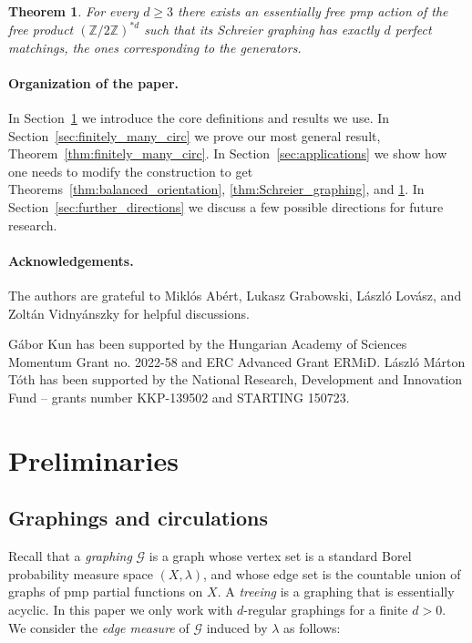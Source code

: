 \documentclass[10pt]{article}
\theoremstyle{plain}
\newtheorem{theorem}[lemma]{Theorem}
\theoremstyle{remark}
\newcommand{\1}{\mathbbm{1}}
\newcommand{\Z}{\mathbb{Z}}
\numberwithin{equation}{section}
\begin{document}
\begin{theorem} \label{thm:perfect_matching}
For every $d\geq3$ there exists an essentially free pmp action of the free product $(\Z / 2\Z)^{*d}$ such that its Schreier graphing has exactly $d$ perfect matchings, the ones corresponding to the generators.
\end{theorem}

\paragraph{Organization of the paper.} In Section~\ref{sec:prelim} we introduce the core definitions and results we use. In Section~\ref{sec:finitely_many_circ} we prove our most general result, Theorem~\ref{thm:finitely_many_circ}. In Section~\ref{sec:applications} we show how one needs to modify the construction to get Theorems~\ref{thm:balanced_orientation}, \ref{thm:Schreier_graphing}, and \ref{thm:perfect_matching}. In Section~\ref{sec:further_directions} we discuss a few possible directions for future research.

\paragraph{Acknowledgements.} The authors are grateful to Miklós Abért,  Lukasz Grabowski, László Lovász, and Zoltán Vidnyánszky for helpful discussions.

Gábor Kun has been supported by the Hungarian Academy of Sciences Momentum Grant no. 2022-58 and ERC Advanced Grant ERMiD.
László Márton Tóth has been supported by the National Research, Development and Innovation Fund -- grants number KKP-139502 and STARTING 150723. 

\section{Preliminaries} \label{sec:prelim}

\subsection{Graphings and circulations}
Recall that a \emph{graphing} $\mathcal{G}$ is a graph whose vertex set is a standard Borel probability measure space $(X, \lambda)$, and whose edge set is the countable union of graphs of pmp partial functions on $X$. A \emph{treeing} is a graphing that is essentially acyclic. In this paper we only work with $d$-regular graphings for a finite $d>0$. We consider the \emph{edge measure} of $\mathcal{G}$ induced by $\lambda$ as follows: 
\end{document}

